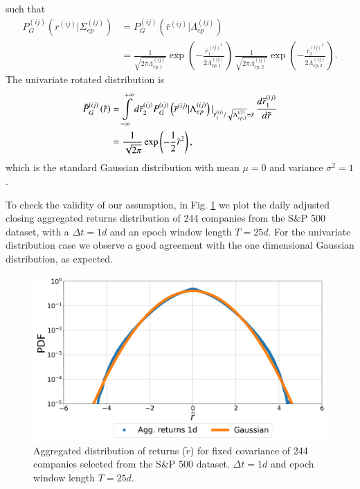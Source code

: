such that
\begin{align}
    P_{G}^{\left(ij\right)}\left(r^{\left(ij\right)}|
    \Sigma_{ep}^{\left(ij\right)}\right)
    &=P_{G}^{\left(ij\right)}\left(\bar{r}^{\left(ij\right)}|
    \Lambda_{ep}^{\left(ij\right)}\right)\\
    &=\frac{1}{\sqrt{2\pi\Lambda_{ep,1}^{\left(ij\right)}}}
    \exp\left(-\frac{\bar{r}_{1}^{\left(ij\right)^{2}}}{2\Lambda_{ep,1}
    ^{\left(ij\right)}}\right)
    \,\frac{1}{\sqrt{2\pi\Lambda_{ep,2}^{\left(ij\right)}}}
    \exp\left(-\frac{\bar{r}_{2}^{\left(ij\right)^{2}}}{2\Lambda_{ep,2}
    ^{\left(ij\right)}}\right).
\end{align}
The univariate rotated distribution is
\begin{align}
    \tilde{P}_{G}^{\left(ij\right)}\left(\tilde{r}\right)
    &=\intop_{-\infty}^{+\infty}d\bar{r}_{2}^{\left(ij\right)}
    P_{G}^{\left(ij\right)}\left(\bar{r}^{\left(ij\right)}|
    \Lambda_{ep}^{\left(ij\right)}\right)\vert_{\bar{r}_{1}^{\left(ij\right)}/
    \sqrt{\Lambda_{ep,1}^{\left(ij\right)}}=\tilde{r}}\,
    \frac{d\bar{r}_{1}^{\left(ij\right)}}{d\tilde{r}}\\
    & =\frac{1}{\sqrt{2\pi}}\exp\left(-\frac{1}{2}\tilde{r}^{2}\right),
\end{align}
which is the standard Gaussian distribution with mean $\mu = 0$ and variance
$\sigma^2 = 1$.

To check the validity of our assumption, in Fig.
\ref{fig:gaussian_agg_returns_epoch} we plot the daily adjusted closing
aggregated returns distribution of 244 companies from the S\&P 500 dataset,
with a $\Delta t = 1d$ and an epoch window length $T = 25d$. For the
univariate distribution case we observe a good agreement with the one
dimensional Gaussian distribution, as expected.

\begin{figure}[htbp]
    \centering
    \includegraphics[width=0.6\columnwidth]
    {figures/05_gaussian_agg_returns_short_epoch.png}
    \caption{Aggregated distribution of returns ($\tilde{r}$) for fixed
             covariance of 244 companies selected from the S\&P 500
             dataset. $\Delta t = 1d$ and epoch window length $T=25d$.}
    \label{fig:gaussian_agg_returns_epoch}
\end{figure}

